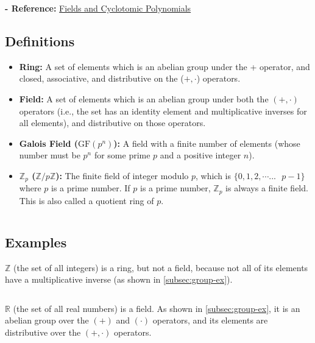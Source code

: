 \textbf{- Reference:} 
\href{https://e.math.cornell.edu/people/belk/numbertheory/CyclotomicPolynomials.pdf}{Fields and Cyclotomic Polynomials}~\cite{cyclotomic-polynomial}

\subsection{Definitions}
\label{subsec:field-def}

\begin{tcolorbox}[title={\textbf{\tboxdef{\ref*{subsec:field-def}} Field Definitions}}]
\begin{itemize}
\item \textbf{Ring:} A set of elements which is an abelian group under the + operator, and closed, associative, and distributive on the ($+, \cdot$) operators. 
\item \textbf{Field:} A set of elements which is an abelian group under both the $(+, \cdot)$ operators (i.e., the set has an identity element and multiplicative inverses for all elements), and distributive on those operators.
\item \textbf{Galois Field ($\text{GF}(p^n)$):} A field with a finite number of elements (whose number must be $p^n$ for some prime $p$ and a positive integer $n$).
\item \textbf{$\mathbb{Z}_p$ ($\mathbb{Z}/p\mathbb{Z}$):} The finite field of integer modulo $p$, which is $\{0, 1, 2, \cdots... \text{ } p - 1\}$ where $p$ is a prime number. If $p$ is a prime number, $\mathbb{Z}_p$ is always a finite field. This is also called a quotient ring of $p$.
\end{itemize}
\end{tcolorbox}
$ $

\subsection{Examples}
\label{subsec:field-ex}

$\mathbb{Z}$ (the set of all integers) is a ring, but not a field, because not all of its elements have a multiplicative inverse (as shown in \autoref{subsec:group-ex}). 

$ $

\noindent $\mathbb{R}$ (the set of all real numbers) is a field. As shown in \autoref{subsec:group-ex}, it is an abelian group over the $(+)$ and $(\cdot)$ operators, and its elements are distributive over the $(+, \cdot)$ operators.


$ $

